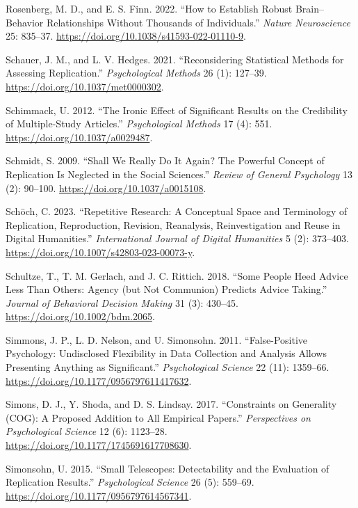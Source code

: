 \documentclass[
  letterpaper,
  DIV=11,
  openany,
  fontsize=12pt,
  parskip=half,
  headings=big,
  numbers=noenddot,
  titlepage=false]{scrreprt}
\newlength{\cslhangindent}
\newenvironment{CSLReferences}[2] %
 {\begin{list}{}{%
  \setlength{\itemindent}{0pt}
  \setlength{\leftmargin}{0pt}
  \setlength{\parsep}{0pt}
  \ifodd #1
   \setlength{\leftmargin}{\cslhangindent}
   \setlength{\itemindent}{-1\cslhangindent}
  \fi
  \setlength{\itemsep}{#2\baselineskip}}}
 {\end{list}}
\begin{document}
\begin{CSLReferences}{1}{0}
Rosenberg, M. D., and E. S. Finn. 2022. {``How to Establish Robust
Brain--Behavior Relationships Without Thousands of Individuals.''}
\emph{Nature Neuroscience} 25: 835--37.
\url{https://doi.org/10.1038/s41593-022-01110-9}.

Schauer, J. M., and L. V. Hedges. 2021. {``Reconsidering Statistical
Methods for Assessing Replication.''} \emph{Psychological Methods} 26
(1): 127--39. \url{https://doi.org/10.1037/met0000302}.

Schimmack, U. 2012. {``The Ironic Effect of Significant Results on the
Credibility of Multiple-Study Articles.''} \emph{Psychological Methods}
17 (4): 551. \url{https://doi.org/10.1037/a0029487}.

Schmidt, S. 2009. {``Shall We Really Do It Again? The Powerful Concept
of Replication Is Neglected in the Social Sciences.''} \emph{Review of
General Psychology} 13 (2): 90--100.
\url{https://doi.org/10.1037/a0015108}.

Schöch, C. 2023. {``Repetitive Research: A Conceptual Space and
Terminology of Replication, Reproduction, Revision, Reanalysis,
Reinvestigation and Reuse in Digital Humanities.''} \emph{International
Journal of Digital Humanities} 5 (2): 373--403.
\url{https://doi.org/10.1007/s42803-023-00073-y}.

Schultze, T., T. M. Gerlach, and J. C. Rittich. 2018. {``Some People
Heed Advice Less Than Others: Agency (but Not Communion) Predicts Advice
Taking.''} \emph{Journal of Behavioral Decision Making} 31 (3): 430--45.
\url{https://doi.org/10.1002/bdm.2065}.

Simmons, J. P., L. D. Nelson, and U. Simonsohn. 2011. {``False-Positive
Psychology: Undisclosed Flexibility in Data Collection and Analysis
Allows Presenting Anything as Significant.''} \emph{Psychological
Science} 22 (11): 1359--66.
\url{https://doi.org/10.1177/0956797611417632}.

Simons, D. J., Y. Shoda, and D. S. Lindsay. 2017. {``Constraints on
Generality (COG): A Proposed Addition to All Empirical Papers.''}
\emph{Perspectives on Psychological Science} 12 (6): 1123--28.
\url{https://doi.org/10.1177/1745691617708630}.

Simonsohn, U. 2015. {``Small Telescopes: Detectability and the
Evaluation of Replication Results.''} \emph{Psychological Science} 26
(5): 559--69. \url{https://doi.org/10.1177/0956797614567341}.


\end{CSLReferences}
\end{document}
